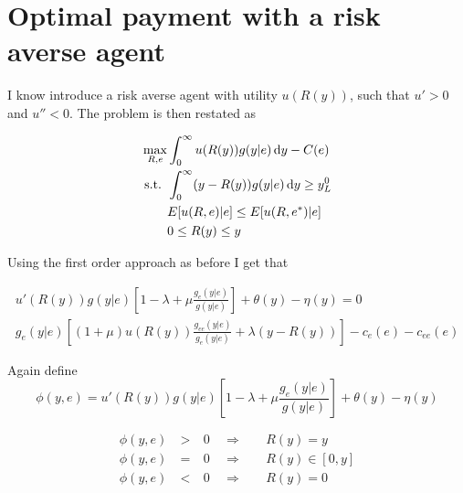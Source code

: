 \section{Optimal payment with a risk averse agent} %
\label{sec:optimal_payment_with_a_risk_averse_agent}
I know introduce a risk averse agent with utility $u(R(y))$, such that $u'>0$ and $u''<0$. The problem is then restated as 

\begin{subequations}
\label{eq:khun-tucker-ra}
\begin{align}
    \max_{R,e} & \int_0^{\infty}u(R(y))g(y|e)\dif y-C(e)\label{subeq:khun-tucker-ra1} \\
    \text{s.t. }    & \int_{0}^{\infty} (y-R(y))g(y|e)\dif y\geq y_L^0 \label{subeq:khun-tucker-ra2} \\
                    & E[u(R,e)|e]\leq E[u(R,e^*)|e] \label{subeq:khun-tucker-ra3}\\
                    & 0\leq R(y)\leq y \label{subeq:khun-tucker-ra4}
\end{align}
\end{subequations}

Using the first order approach as before I get that 

\begin{subequations}
\label{eq:lagrange-ra}
\begin{align}
    u'(R(y))g(y|e)\left[1-\lambda+\mu \frac{g_e(y|e)}{g(y|e)}\right] + \theta(y)-\eta(y)=0 \\
    g_e(y|e)\left[(1+\mu)u(R(y))\frac{g_{ee}(y|e)}{g_e(y|e)}+\lambda(y-R(y))\right]-c_e(e)-c_{ee}(e)
\end{align}
\end{subequations}

Again define 
\[
    \phi(y,e) = u'(R(y))g(y|e)\left[1-\lambda+\mu \frac{g_e(y|e)}{g(y|e)}\right]  + \theta(y)-\eta(y)
\]

\begin{subequations}
\label{eq:KT-analysis-ra}
\begin{alignat}{3}
    \phi(y,e) & \: > \: & 0 & \enspace \Rightarrow & & \enspace R(y)=y \label{subeq:large-y-ra}\\
    \phi(y,e) & \: = \: & 0 & \enspace \Rightarrow & & \enspace R(y)\in [0,y] \label{subeq:interval-y-ra} \\
    \phi(y,e) & \: < \: & 0 & \enspace \Rightarrow & & \enspace R(y) =0 \label{subeq:small-y-ra}
\end{alignat}
\end{subequations}

